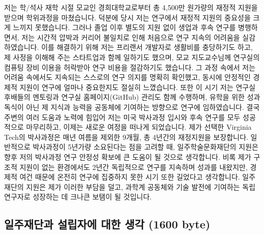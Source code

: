 \documentclass{article}
\begin{document}
저는 학/석사 재학 시절 모교인 경희대학교로부터 총 4,500만 원가량의 재정적 지원을 받으며 학위과정을 마쳤습니다. 덕분에 당시 저는 연구에서 재정적 지원의 중요성을 크게 느끼지 못했습니다. 그러나 졸업 이후 별도의 지원 없이 생업과 후속 연구를 병행하면서, 저는 시간적 압박과 커리어 불일치로 인해 처음으로 연구 지속의 어려움을 실감하였습니다. 이를 해결하기 위해 저는 프리랜서 개발자로 생활비를 충당하기도 하고, 제 사정을 이해해 주는 스타트업과 함께 일하기도 했으며, 모교 지도교수님께 연구실의 컴퓨팅 장비 이용을 허락받아 연구 비용을 절감하기도 했습니다. 그 과정 속에서 저는 어려움 속에서도 지속되는 스스로의 연구 의지를 명확히 확인했고, 동시에 안정적인 경제적 지원이 연구에 얼마나 중요한지도 절실히 느꼈습니다. 또한 이 시기 저는 연구실 후배들의 멘토링과 연구실 홈페이지(GitHub) 관리도 함께 수행하며, 유학을 위한 성과 독식이 아닌 제 지식과 능력을 공동체에 기여하는 방향으로 연구에 임하였습니다. 결국 주변의 여러 도움과 노력에 힘입어 저는 미국 박사과정 입시와 후속 연구를 모두 성공적으로 마무리하고, 이제는 새로운 여정을 떠나게 되었습니다. 제가 선택한 Virginia Tech의 박사과정은 매년 여름을 제외한 9개월, 총 4년간의 재정지원을 보장합니다. 일반적으로 박사과정이 5년가량 소요된다는 점을 고려할 때, 일주학술문화재단의 지원은 향후 저의 박사과정 연구 안정성 확보에 큰 도움이 될 것으로 생각합니다. 비록 제가 구조적 지원이 없는 환경에서도 2년간 독립적으로 연구를 지속하며 성과를 내왔지만, 경제적 여건 때문에 온전히 연구에 집중하지 못한 시기 또한 길었다고 생각합니다. 일주재단의 지원은 제가 이러한 부담을 덜고, 과학계 공동체와 기술 발전에 기여하는 독립 연구자로 성장하는 데 크나큰 보탬이 될 것입니다.


\subsection{일주재단과 설립자에 대한 생각 (1600 byte)}
\end{document}
